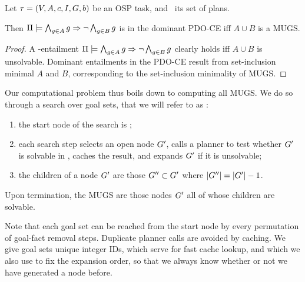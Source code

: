 \begin{proposition}
Let $\tau =
(V,\allowbreak A,\allowbreak{\ensuremath{c}},\allowbreak I,\allowbreak G,\allowbreak{\ensuremath{b}})$
be an OSP task, and \plans\ its set of plans.  

Then $\Pi \models \bigwedge_{g \in A} g \Rightarrow \neg \bigwedge_{g \in B}
  g$ is in the dominant PDO-CE iff $A \cup B$ is a MUGS.
\end{proposition}

\begin{proof}
A \plans-entailment $\Pi \models \bigwedge_{g \in A} g \Rightarrow \neg
  \bigwedge_{g \in B} g$ clearly holds iff $A \cup B$ is
unsolvable. Dominant entailments in the PDO-CE result from
set-inclusion minimal $A$ and $B$, corresponding to the set-inclusion
minimality of MUGS.
\end{proof}

Our computational problem thus boils down to computing all MUGS. We do
so through a search over goal sets, that we will refer to as
:
\begin{enumerate}[(1)]
\item the start node of the search is \goal; 
\item each search step selects an open node $G'$, calls a planner
  to test whether $G'$ is solvable in \task, caches the result,
  and expands $G'$ if it is unsolvable;
\item the children of a node $G'$ are those $G'' \subset
  G'$ where $|G''| = |G'|-1$.
\end{enumerate}
Upon termination, the MUGS are those nodes $G'$ all of whose
children are solvable. 

Note that each goal set can be reached from the start node by every
permutation of goal-fact removal steps. Duplicate planner calls are
avoided by caching. We give goal sets unique integer IDs, which serve
for fast cache lookup, and which we also use to fix the expansion
order, so that we always know whether or not we have generated a node
before.

